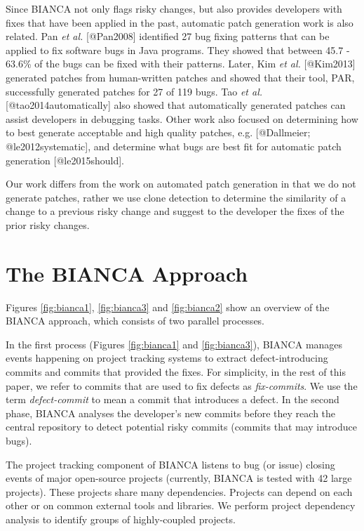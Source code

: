 Since BIANCA not only flags risky changes, but also provides developers
with fixes that have been applied in the past, automatic patch
generation work is also related. Pan \emph{et al.} {[}@Pan2008{]}
identified 27 bug fixing patterns that can be applied to fix software
bugs in Java programs. They showed that between 45.7 - 63.6\% of the
bugs can be fixed with their patterns. Later, Kim \emph{et al.}
{[}@Kim2013{]} generated patches from human-written patches and showed
that their tool, PAR, successfully generated patches for 27 of 119 bugs.
Tao \emph{et al.} {[}@tao2014automatically{]} also showed that
automatically generated patches can assist developers in debugging
tasks. Other work also focused on determining how to best generate
acceptable and high quality patches, e.g. {[}@Dallmeier;
@le2012systematic{]}, and determine what bugs are best fit for automatic
patch generation {[}@le2015should{]}.

Our work differs from the work on automated patch generation in that we
do not generate patches, rather we use clone detection to determine the
similarity of a change to a previous risky change and suggest to the
developer the fixes of the prior risky changes.

\section{The BIANCA Approach}\label{sec:bianca}

Figures \ref{fig:bianca1}, \ref{fig:bianca3} and \ref{fig:bianca2} show
an overview of the BIANCA approach, which consists of two parallel
processes.

In the first process (Figures \ref{fig:bianca1} and \ref{fig:bianca3}),
BIANCA manages events happening on project tracking systems to extract
defect-introducing commits and commits that provided the fixes. For
simplicity, in the rest of this paper, we refer to commits that are used
to fix defects as \emph{fix-commits}. We use the term
\emph{defect-commit} to mean a commit that introduces a defect. In the
second phase, BIANCA analyses the developer's new commits before they
reach the central repository to detect potential risky commits (commits
that may introduce bugs).



The project tracking component of BIANCA listens to bug (or issue)
closing events of major open-source projects (currently, BIANCA is
tested with 42 large projects). These projects share many dependencies.
Projects can depend on each other or on common external tools and
libraries. We perform project dependency analysis to identify groups of
highly-coupled projects.

